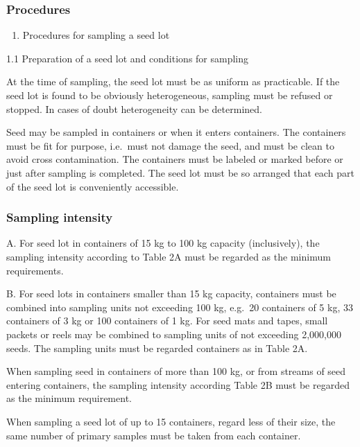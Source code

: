 \documentclass[
]{book}
\providecommand{\tightlist}{%
  \setlength{\itemsep}{0pt}\setlength{\parskip}{0pt}}
\begin{document}
\hypertarget{procedures}{%
\subsubsection{Procedures}\label{procedures}}

\begin{enumerate}
\def\labelenumi{\arabic{enumi}.}
\tightlist
\item
  Procedures for sampling a seed lot
\end{enumerate}

1.1 Preparation of a seed lot and conditions for sampling

At the time of sampling, the seed lot must be as uniform as practicable. If the seed lot is found to be obviously heterogeneous, sampling must be refused or stopped. In cases of doubt heterogeneity can be determined.

Seed may be sampled in containers or when it enters containers. The containers must be fit for purpose, i.e.~must not damage the seed, and must be clean to avoid cross contamination. The containers must be labeled or marked before or just after sampling is completed. The seed lot must be so arranged that each part of the seed lot is conveniently accessible.

\hypertarget{sampling-intensity-1}{%
\subsubsection{Sampling intensity}\label{sampling-intensity-1}}

A. For seed lot in containers of 15 kg to 100 kg capacity (inclusively), the sampling intensity according to Table 2A must be regarded as the minimum requirements.

B. For seed lots in containers smaller than 15 kg capacity, containers must be combined into sampling units not exceeding 100 kg, e.g.~20 containers of 5 kg, 33 containers of 3 kg or 100 containers of 1 kg. For seed mats and tapes, small packets or reels may be combined to sampling units of not exceeding 2,000,000 seeds. The sampling units must be regarded containers as in Table 2A.

When sampling seed in containers of more than 100 kg, or from streams of seed entering containers, the sampling intensity according Table 2B must be regarded as the minimum requirement.

When sampling a seed lot of up to 15 containers, regard less of their size, the same number of primary samples must be taken from each container.
\end{document}
